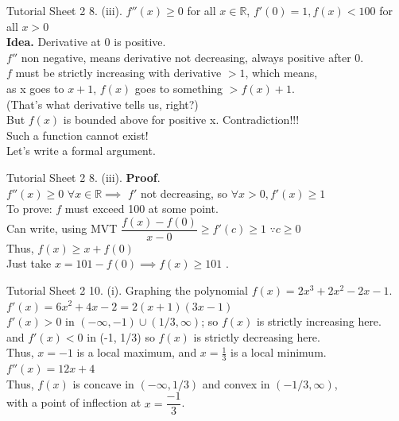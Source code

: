 \documentclass[aspectratio=169]{beamer}
\begin{document}
\begin{frame}{Tutorial Sheet 2}
    8. (iii). $f''(x) \geq 0$ for all $x \in \mathbb{R}$, $f'(0) = 1, f(x) <100$ for all $x>0$ \\
    \medskip 
    \textbf{Idea.}
    Derivative at 0 is positive. \\
    $f''$ non negative, means derivative not decreasing, always positive after 0. \\
    $f$ must be strictly increasing with derivative $>1$, which means, \\
    as x goes to $x+1$, $f(x)$ goes to something $> f(x)+1.$ \\
    (That's what derivative tells us, right?)\\
    But $f(x)$ is bounded above for positive x. Contradiction!!! \\
    \smallskip
    Such a function cannot exist! \\
    Let's write a formal argument. \\
\end{frame}

\begin{frame}{Tutorial Sheet 2}
    8. (iii). \textbf{Proof}. \\
    $f''(x) \geq 0$  \hspace{5pt} $ \forall x \in \mathbb{R} \implies $ $f'$ not decreasing, so $\forall x>0, f'(x)\geq 1$ \\
    To prove: $f$ must exceed 100 at some point. \\
    \medskip
    Can write, using MVT $\dfrac{f(x)-f(0)}{x-0} \geq f'(c) \geq 1$ $\because c \geq 0$ \\
    \smallskip
    Thus, $f(x)\geq x+f(0)$ \\
    \smallskip
    Just take $x=101-f(0) \implies f(x) \geq 101$ . \\
\end{frame}

\begin{frame}{Tutorial Sheet 2}
    10. (i). Graphing the polynomial $f(x)=2x^3+2x^2-2x-1$. \\
    \smallskip
    $f'(x)=6x^2+4x-2 = 2(x+1)(3x-1)$ \\
    \smallskip
    $f'(x)>0$ in $(-\infty, -1) \cup (1/3, \infty)$;  so $f(x)$ is strictly increasing here. \\
    \medskip
    and $f'(x)<0$ in (-1, 1/3) so $f(x)$ is strictly decreasing here. \\
    \medskip
    Thus, $x=-1$ is a local maximum, and $x=\frac{1}{3}$ is a local minimum. \\
    \medskip
    $f''(x)=12x+4$ \\
    \medskip
    Thus, $f(x)$ is concave in $(-\infty,1/3)$ and convex in $(-1/3, \infty)$, \\
    \smallskip
    with a point of inflection at $x=\dfrac{-1}{3}$.
\end{frame}
\end{document}
